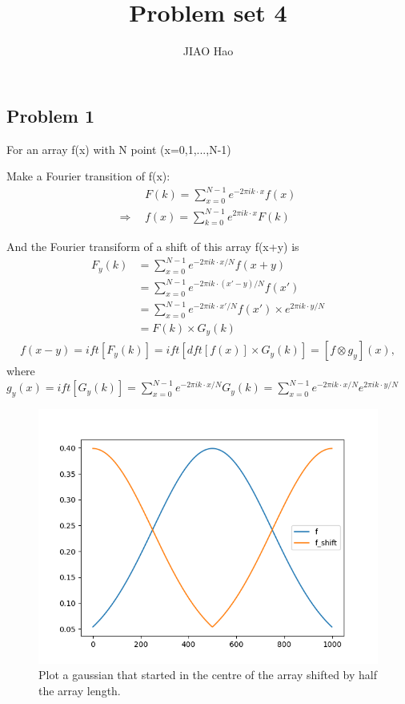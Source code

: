 \documentclass[showpacs, oneside, onecolumn, prl, amsmath, amssymb, nofootinbib, superscriptaddress, notitlepage]{revtex4-1}
\newcommand\ba{\begin{align}}
\newcommand\bas{\begin{align*}}
\newcommand\bfig{\begin{figure}}
\newcommand\efig{\end{figure}}
\newcommand\blue{\textcolor{blue}}
\newcommand\gray{\textcolor{gray}}
\begin{document}
	
\title{Problem set 4}


\author{JIAO Hao}


%
%
%


\maketitle


\subsection{Problem 1}

For an array f(x) with N point (x=0,1,...,N-1)

Make a Fourier transition of f(x):
\ba
&F(k)=\sum_{x=0}^{N-1}e^{-2\pi ik\cdot x}f(x)\\
\Rightarrow\ \ &f(x)=\sum_{k=0}^{N-1}e^{2\pi ik\cdot x}F(k)
\end{align}

And the Fourier transiform of a shift of this array f(x+y) is
\bas
F_y(k)&= \sum_{x=0}^{N-1}e^{-2\pi ik\cdot x/N}f(x+y)\\
&= \sum_{x=0}^{N-1}e^{-2\pi ik\cdot (x'-y)/N}f(x')\\
&= \sum_{x=0}^{N-1}e^{-2\pi ik\cdot x'/N}f(x')\times e^{2\pi ik\cdot y/N}\\
&= F(k)\times G_y(k)
\end{align*}
\bas
f(x-y)=ift[F_y(k)]=ift[dft[f(x)]\times G_y(k)]=[f\otimes g_y](x),
\end{align*}
where $g_y(x)=ift[G_y(k)]=\sum_{x=0}^{N-1}e^{-2\pi ik\cdot x/N}G_y(k)=\sum_{x=0}^{N-1}e^{-2\pi ik\cdot x/N}e^{2\pi ik\cdot y/N}$

\bfig
	\centering
	\includegraphics[scale=1]{4-1.png}
	\caption{Plot a gaussian that started in the centre of the array shifted by half the array length.}
	\label{4-1}
\efig
\end{document}
